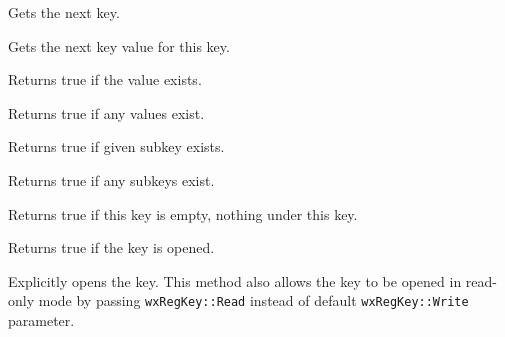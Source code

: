 Gets the next key.


\label{wxregkeygetnextvalue}


Gets the next key value for this key.


\label{wxregkeyhasvalue}


Returns true if the value exists.


\label{wxregkeyhasvalues}


Returns true if any values exist.


\label{wxregkeyhassubkey}


Returns true if given subkey exists.


\label{wxregkeyhassubkeys}


Returns true if any subkeys exist.


\label{wxregkeyisempty}


Returns true if this key is empty, nothing under this key.


\label{wxregkeyisopened}


Returns true if the key is opened.


\label{wxregkeyopen}


Explicitly opens the key. This method also allows the key to be opened in
read-only mode by passing \texttt{wxRegKey::Read} instead of default 
\texttt{wxRegKey::Write} parameter.


\label{wxregkeyqueryvalue}


